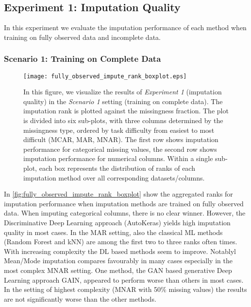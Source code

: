 

\subsection{Experiment 1: Imputation Quality}

In this experiment we evaluate the imputation performance of each method when training on fully observed data and incomplete data.

\subsubsection{Scenario 1: Training on Complete Data}

\begin{figure}\centering
    \texttt{[image: fully\_observed\_impute\_rank\_boxplot.eps]}
    \caption[Imputation Ranks - Fully Observed]{In this figure, we visualize the results of \textit{Experiment 1} (imputation quality) in the \textit{Scenario 1} setting (training on complete data). The imputation rank is plotted against the missingness fraction. The plot is divided into six sub-plots, with three columns determined by the missingness type, ordered by task difficulty from easiest to most difficult (MCAR, MAR, MNAR). The first row shows imputation performance for categorical missing values,  the second row shows imputation performance for numerical columns. Within a single sub-plot, each box represents the distribution of ranks of each imputation method over all corresponding datasets/columns.}\label{fig:fully_observed_impute_rank_boxplot}
\end{figure}

In  \autoref{fig:fully_observed_impute_rank_boxplot} show the aggregated ranks for imputation performance when imputation methods are trained on fully observed data.
When imputing categorical columns, there is no clear winner. However, the Discriminative Deep Learning approach (AutoKeras) yields high imputation quality in most cases. In the MAR setting, also the classical ML methods (Random Forest and kNN) are among the first two to three ranks often times. With increasing complexity the DL based methods seem to improve. Notablyl Mean/Mode imputation compares favourably in many cases especially in the most complex MNAR setting. One method, the GAN based generative Deep Learning approach GAIN, appeared to perform worse than others in most cases. In the setting of highest complexity (MNAR with 50\% missing values) the results are not significantly worse than the other methods.

